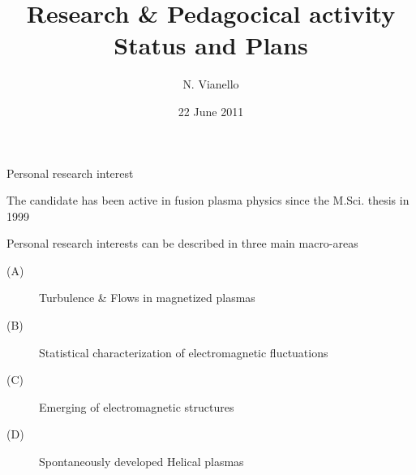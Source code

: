 \documentclass[t,10pt]{beamer}
\title{Research \& Pedagocical activity \\
{\small Status and Plans}}
\author{N. Vianello }
\date{22 June 2011}
\begin{document}
\begin{titleframe}
\end{titleframe}

\begin{frame}{Personal research interest}
\begin{itemize}
{\large\item The candidate has been active in fusion plasma physics since the
M.Sci. thesis in 1999
\item Personal research interests can be described in three main
  macro-areas
\begin{description}
\item[(A)] \textcolor{taorange}{Turbulence \& Flows in magnetized plasmas}
\item[(B)] \textcolor{ta3skyblue}{Statistical characterization of
    electromagnetic fluctuations}
\item[(C)]\textcolor{ta3chameleon}{Emerging of electromagnetic structures}
\item[(D)] \textcolor{tascarletred}{Spontaneously developed Helical plasmas}
\end{description}
}\end{itemize}
\end{frame}
\end{document}

